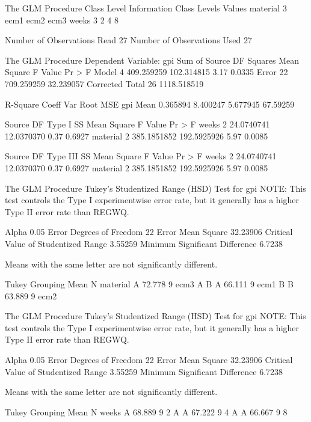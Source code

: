 \documentclass{article}
\begin{document}
\begin{Woutput}
The GLM Procedure
        Class Level Information
Class         Levels    Values
material           3    ecm1 ecm2 ecm3
weeks              3    2 4 8

Number of Observations Read          27
Number of Observations Used          27

The GLM Procedure
Dependent Variable: gpi
                                        Sum of
Source                      DF         Squares     Mean Square    F Value    Pr > F
Model                        4      409.259259      102.314815       3.17    0.0335
Error                       22      709.259259       32.239057
Corrected Total             26     1118.518519

R-Square     Coeff Var      Root MSE      gpi Mean
0.365894      8.400247      5.677945      67.59259

Source                      DF       Type I SS     Mean Square    F Value    Pr > F
weeks                        2      24.0740741      12.0370370       0.37    0.6927
material                     2     385.1851852     192.5925926       5.97    0.0085

Source                      DF     Type III SS     Mean Square    F Value    Pr > F
weeks                        2      24.0740741      12.0370370       0.37    0.6927
material                     2     385.1851852     192.5925926       5.97    0.0085

The GLM Procedure
Tukey's Studentized Range (HSD) Test for gpi
NOTE: This test controls the Type I experimentwise error rate, but it generally has a higher Type
II error rate than REGWQ.

Alpha                                   0.05
Error Degrees of Freedom                  22
Error Mean Square                   32.23906
Critical Value of Studentized Range  3.55259
Minimum Significant Difference        6.7238

Means with the same letter are not significantly different.

Tukey
Grouping 
                Mean      N    material
     A        72.778      9    ecm3
     A
B    A        66.111      9    ecm1
B
B             63.889      9    ecm2

The GLM Procedure
Tukey's Studentized Range (HSD) Test for gpi
NOTE: This test controls the Type I experimentwise error rate, but it generally has a higher Type
II error rate than REGWQ.

Alpha                                   0.05
Error Degrees of Freedom                  22
Error Mean Square                   32.23906
Critical Value of Studentized Range  3.55259
Minimum Significant Difference        6.7238

Means with the same letter are not significantly different.

Tukey
Grouping
           Mean      N    weeks
A        68.889      9    2
A
A        67.222      9    4
A
A        66.667      9    8
\end{Woutput}
\end{document}
